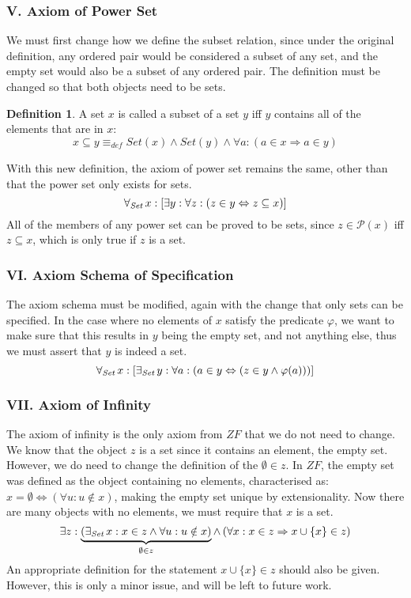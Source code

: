 \documentclass[11pt]{report}
\newcommand{\all}[1]{\forall_{\mathit{#1}}\hspace{0.5mm}}
\newcommand{\ex}[1]{\exists_{\mathit{#1}}\hspace{0.5mm}}
\newcommand{\eqdef}{\equiv_\mathit{def}}
\theoremstyle{definition}
\theoremstyle{theorem}
\theoremstyle{lemma}
\newtheorem{definition}{Definition}[section]
\begin{document}
\subsubsection*{V. Axiom of Power Set}
We must first change how we define the subset relation, since under the original definition, any ordered pair would be considered a subset of any set, and the empty set would also be a subset of any ordered pair.
The definition must be changed so that both objects need to be sets.

\begin{definition} A set $x$ is called a subset of a set $y$ iff $y$ contains all of the elements that are in $x$:
$$x\subseteq y \eqdef \mathit{Set}(x) \wedge
               \mathit{Set}(y) \wedge
                \forall a: (a\in x \Rightarrow a\in y)$$
\end{definition}

\noindent
With this new definition, the axiom of power set remains the same, other than that the power set only exists for sets.
$$\all{Set}x: [\exists y:\forall z:
    (z\in y \Leftrightarrow z\subseteq x)]$$
All of the members of any power set can be proved to be sets, since $z\in \mathcal{P}(x)$ iff $z\subseteq x$, which is only true if $z$ is a set.

\subsubsection*{VI. Axiom Schema of Specification}
The axiom schema must be modified, again with the change that only sets can be specified. 
In the case where no elements of $x$ satisfy the predicate $\varphi$, we want to make sure that this results in $y$ being the empty set, and not anything else, thus we must assert that $y$ is indeed a set.
$$\all{Set}x: [\ex{Set} y:\forall a:
    (a\in y \Leftrightarrow (z\in y \wedge \varphi(a)))]$$

\subsubsection*{VII. Axiom of Infinity}
The axiom of infinity is the only axiom from $\mathit{ZF}$ that we do not need to change. 
We know that the object $z$ is a set since it contains an element, the empty set. 
However, we do need to change the definition of the $\emptyset \in z$. In $\mathit{ZF}$, the empty set was defined as the object containing no elements, characterised as: $x = \emptyset \iff (\forall u: u\notin x)$, making the empty set unique by extensionality.
Now there are many objects with no elements, we must require that $x$ is a set.
$$\exists z: \underbrace
                {(\ex{Set}x:x\in z \wedge\forall u:u\notin x)}
                _{{\emptyset\in z}}
                \wedge\hspace{0.6mm} (\forall x: x\in z \Rightarrow x\cup\{x\}\in z)$$
An appropriate definition for the statement $x\cup \{x\} \in z$ should also be given. However, this is only a minor issue, and will be left to future work.
\end{document}
